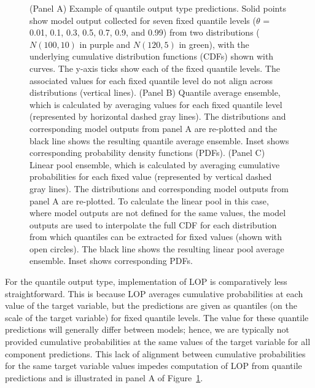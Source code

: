 \documentclass[
  letterpaper,
  DIV=11,
  numbers=noendperiod]{scrartcl}
\begin{document}
\begin{figure}


\caption{\label{fig-example-quantile-average-and-linear-pool}(Panel A)
Example of quantile output type predictions. Solid points show model
output collected for seven fixed quantile levels (\(\theta\) = 0.01,
0.1, 0.3, 0.5, 0.7, 0.9, and 0.99) from two distributions
(\(N(100, 10)\) in purple and \(N(120, 5)\) in green), with the
underlying cumulative distribution functions (CDFs) shown with curves.
The y-axis ticks show each of the fixed quantile levels. The associated
values for each fixed quantile level do not align across distributions
(vertical lines). (Panel B) Quantile average ensemble, which is
calculated by averaging values for each fixed quantile level
(represented by horizontal dashed gray lines). The distributions and
corresponding model outputs from panel A are re-plotted and the black
line shows the resulting quantile average ensemble. Inset shows
corresponding probability density functions (PDFs). (Panel C) Linear
pool ensemble, which is calculated by averaging cumulative probabilities
for each fixed value (represented by vertical dashed gray lines). The
distributions and corresponding model outputs from panel A are
re-plotted. To calculate the linear pool in this case, where model
outputs are not defined for the same values, the model outputs are used
to interpolate the full CDF for each distribution from which quantiles
can be extracted for fixed values (shown with open circles). The black
line shows the resulting linear pool average ensemble. Inset shows
corresponding PDFs.}

\end{figure}%

For the quantile output type, implementation of LOP is comparatively
less straightforward. This is because LOP averages cumulative
probabilities at each value of the target variable, but the predictions
are given as quantiles (on the scale of the target variable) for fixed
quantile levels. The value for these quantile predictions will generally
differ between models; hence, we are typically not provided cumulative
probabilities at the same values of the target variable for all
component predictions. This lack of alignment between cumulative
probabilities for the same target variable values impedes computation of
LOP from quantile predictions and is illustrated in panel A of
Figure~\ref{fig-example-quantile-average-and-linear-pool}.
\end{document}
